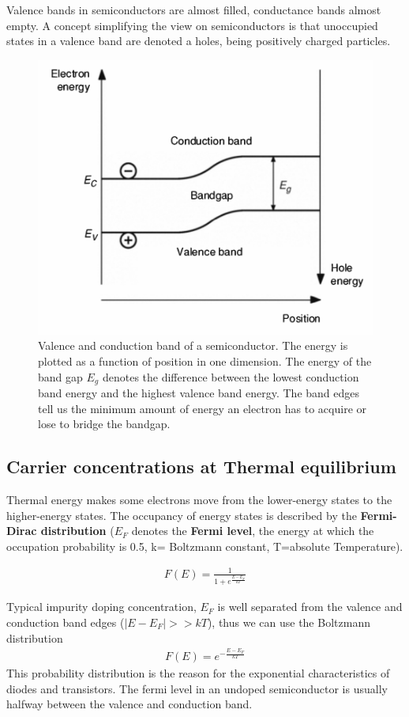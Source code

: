 \documentclass[report]{subfiles}
\begin{document}
Valence bands in semiconductors are almost filled, conductance bands almost empty. A concept simplifying the view on semiconductors is that unoccupied states in a valence band are denoted a holes, being positively charged particles.

\begin{figure}[H]
\centering
\includegraphics[scale=0.5]{pics/bandgap.png}
\caption{Valence and conduction band of a semiconductor. The energy is plotted as a function of position in one dimension. The energy of the band gap \(E_g\) denotes the difference between the lowest conduction band energy and the highest valence band energy. The band edges tell us the minimum amount of energy an electron has to acquire or lose to bridge the bandgap.}
\end{figure}

\subsection{Carrier concentrations at Thermal equilibrium}
Thermal energy makes some electrons move from the lower-energy states to the higher-energy states. The occupancy of energy states is described by the \textbf{Fermi-Dirac distribution} (\(E_F\) denotes the \textbf{Fermi level}, the energy at which the occupation probability is 0.5, k= Boltzmann constant, T=absolute Temperature).

\begin{align*}
F(E) = \frac{1}{1+e^{\frac{E-E_F}{kT}}}
\end{align*}

Typical impurity doping concentration, \(E_F\) is well separated from the valence and conduction band edges (\(|E-E_F| >> kT\)), thus we can use the Boltzmann distribution
\begin{align*}
F(E) = e^{-\frac{E-E_F}{kT}}
\end{align*}
This probability distribution is the reason for the exponential characteristics of diodes and transistors. The fermi level in an undoped semiconductor is usually halfway between the valence and conduction band.
\end{document}
